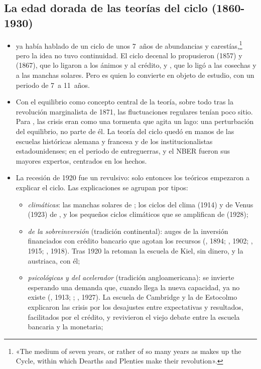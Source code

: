 \documentclass[11pt]{article}
\begin{document}
\subsection{La edad dorada de las teorías del ciclo (1860-1930)}

\begin{itemize}
\item {} ya había hablado de un ciclo de unos 7~años de abundancias y carestías,\footnote{«The medium of seven years, or rather of so many years as makes up the Cycle, within which Dearths and Plenties make their revolution»\nocite{Petty1662Treatise}.} pero la idea no tuvo continuidad. El ciclo decenal lo propusieron  (1857) y  (1867), que lo ligaron a los ánimos y al crédito, y , que lo ligó a las cosechas y a las manchas solares\nocite{Jevons1884Investigations}. Pero es \textcite{Juglar1862Crises} quien lo convierte en objeto de estudio, con un periodo de 7~a 11~años.
\item Con el equilibrio como concepto central de la teoría, sobre todo tras la revolución marginalista de 1871, las fluctuaciones regulares tenían poco sitio. Para , las crisis eran como una tormenta que agita un lago: una perturbación del equilibrio, no parte de él\nocite{Walras1874Elements}. La teoría del ciclo quedó en manos de las escuelas históricas alemana y francesa y de los institucionalistas estadounidenses; en el periodo de entreguerras,  y el NBER fueron sus mayores expertos, centrados en los hechos.
\item La recesión de 1920 fue un revulsivo: solo entonces los teóricos empezaron a explicar el ciclo. Las explicaciones se agrupan por tipos:
  \begin{itemize}
  \item \emph{climáticas}: las manchas solares de ; los ciclos del clima (1914) y de Venus (1923) de , y los pequeños ciclos climáticos que se amplifican de  (1928);
  \item \emph{de la sobreinversión} (tradición continental): auges de la inversión financiados con crédito bancario que agotan los recursos (, 1894; , 1902; , 1915; , 1918). Tras 1920 la retoman la escuela de Kiel, sin dinero, y la austriaca, con él;
  \item \emph{psicológicas y del acelerador} (tradición angloamericana): se invierte esperando una demanda que, cuando llega la nueva capacidad, ya no existe (, 1913; \textcite{Clark1917Business}; , 1927). La escuela de Cambridge y la de Estocolmo explicaron las crisis por los desajustes entre expectativas y resultados, facilitados por el crédito, y revivieron el viejo debate entre la escuela bancaria y la monetaria;

\end{itemize}
\end{itemize}
\end{document}
